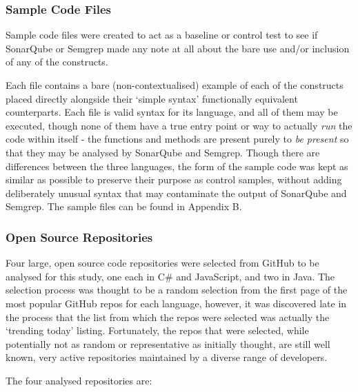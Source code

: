 \documentclass{article}
\begin{document}
        \subsubsection{Sample Code Files}
        \label{subsubsec:sampleFile}
            Sample code files were created to act as a baseline or control test to see if SonarQube or Semgrep made any note at all about the bare use and/or inclusion of any of the constructs.

            Each file contains a bare (non-contextualised) example of each of the constructs placed directly alongside their `simple syntax' functionally equivalent counterparts. Each file is valid syntax for its language, and all of them may be executed, though none of them have a true entry point or way to actually \emph{run} the code within itself - the functions and methods are present purely to \emph{be present} so that they may be analysed by SonarQube and Semgrep. Though there are differences between the three languages, the form of the sample code was kept as similar as possible to preserve their purpose as control samples, without adding deliberately unusual syntax that may contaminate the output of SonarQube and Semgrep. The sample files can be found in Appendix B.

        \subsubsection{Open Source Repositories}
        \label{subsubsec:osRepos}
            Four large, open source code repositories were selected from GitHub to be analysed for this study, one each in C\# and JavaScript, and two in Java. The selection process was thought to be a random selection from the first page of the most popular GitHub repos for each language, however, it was discovered late in the process that the list from which the repos were selected was actually the `trending today' listing.  Fortunately, the repos that were selected, while potentially not as random or representative as initially thought, are still well known, very active repositories maintained by a diverse range of developers.

            The four analysed repositories are:
\end{document}

